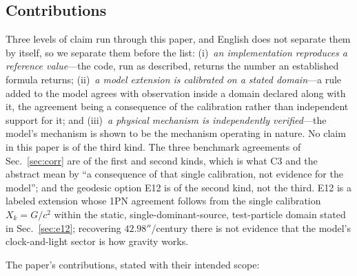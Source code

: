 \documentclass[aps,reprint,amsmath,amssymb,nofootinbib,superscriptaddress,floatfix]{revtex4-2}
\newcommand{\Kt}{X_k}
\begin{document}
\subsection{Contributions}
\label{sec:contributions}

Three levels of claim run through this paper, and English does not
separate them by itself, so we separate them before the list:
(i)~\emph{an implementation reproduces a reference value}---the code,
run as described, returns the number an established formula returns;
(ii)~\emph{a model extension is calibrated on a stated domain}---a rule
added to the model agrees with observation inside a domain declared
along with it, the agreement being a consequence of the calibration
rather than independent support for it; and
(iii)~\emph{a physical mechanism is independently verified}---the
model's mechanism is shown to be the mechanism operating in nature.
No claim in this paper is of the third kind.
The three benchmark agreements of Sec.~\ref{sec:corr} are of the first
and second kinds, which is what C3 and the abstract mean by
``a consequence of that single calibration, not evidence for the
model''; and the geodesic option E12 is of the second kind, not the
third.
E12 is a labeled extension whose 1PN agreement follows from the single
calibration $\Kt = G/c^2$ within the static, single-dominant-source,
test-particle domain stated in Sec.~\ref{sec:e12}; recovering
$42.98''$/century there is not evidence that the model's
clock-and-light sector is how gravity works.

The paper's contributions, stated with their intended scope:
\end{document}
